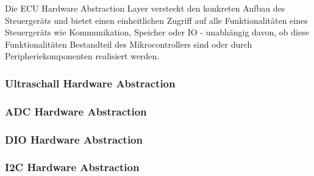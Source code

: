 Die ECU Hardware Abstraction Layer versteckt den konkreten Aufbau des Steuergeräts und bietet einen einheitlichen Zugriff auf alle Funktionalitäten eines Steuergeräts wie Kommunikation, Speicher oder IO - unabhängig davon, ob diese Funktionalitäten Bestandteil des Mikrocontrollers sind oder durch Peripheriekomponenten realisiert werden.


\subsubsection{Ultraschall Hardware Abstraction}


\subsubsection{ADC Hardware Abstraction}

\subsubsection{DIO Hardware Abstraction}


\subsubsection{I2C Hardware Abstraction}


